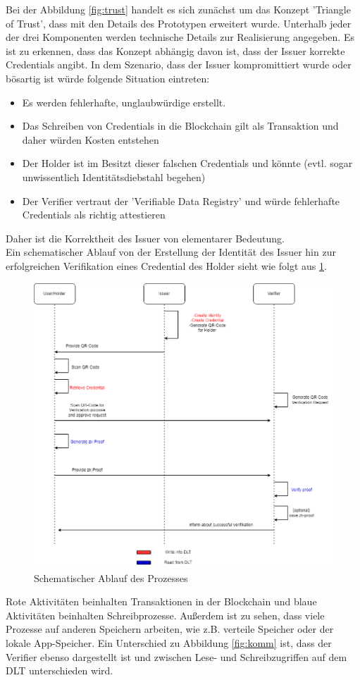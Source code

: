 Bei der Abbildung \ref{fig:trust} handelt es sich zunächst um das Konzept 'Triangle of Trust', dass mit den Details des Prototypen erweitert wurde. Unterhalb jeder der drei Komponenten werden technische Details zur Realisierung angegeben. Es ist zu erkennen, dass das Konzept abhängig davon ist, dass der Issuer korrekte Credentials angibt. In dem Szenario, dass der Issuer kompromittiert wurde oder bösartig ist würde folgende Situation eintreten:
\begin{itemize}
	\item Es werden fehlerhafte, unglaubwürdige erstellt.
	\item Das Schreiben von Credentials in die Blockchain gilt als Transaktion und daher würden Kosten entstehen
	\item Der Holder ist im Besitzt dieser falschen Credentials und könnte (evtl. sogar unwissentlich Identitätsdiebstahl begehen)
	\item Der Verifier vertraut der 'Verifiable Data Registry' und würde fehlerhafte Credentials als richtig attestieren
\end{itemize} 
Daher ist die Korrektheit des Issuer von elementarer Bedeutung. \\
Ein schematischer Ablauf von der Erstellung der Identität des Issuer hin zur erfolgreichen Verifikation eines Credential des Holder sieht wie folgt aus \ref{fig:kommunikation}.
\begin{figure}[H]
	\centering
	\includegraphics[scale=0.4]{media/kommunikation}
	\caption{Schematischer Ablauf des Prozesses}
	\label{fig:kommunikation}
\end{figure}
Rote Aktivitäten beinhalten Transaktionen in der Blockchain und blaue Aktivitäten beinhalten Schreibprozesse. Außerdem ist zu sehen, dass viele Prozesse auf anderen Speichern arbeiten, wie z.B. verteile Speicher oder der lokale App-Speicher. Ein Unterschied zu Abbildung \ref{fig:komm} ist, dass der Verifier ebenso dargestellt ist und zwischen Lese- und Schreibzugriffen auf dem DLT unterschieden wird.
